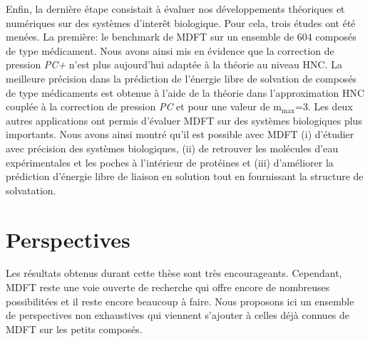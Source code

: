 Enfin, la dernière étape consistait à évaluer nos développements théoriques et numériques sur des systèmes d'interêt biologique. Pour cela, trois études ont été menées. La première: le benchmark de MDFT sur un ensemble de 604 composés de type médicament. Nous avons ainsi mis en évidence que la correction de pression \textit{PC+} n'est plus aujourd'hui adaptée à la théorie au niveau HNC. La meilleure précision dans la prédiction de l'énergie libre de solvation de composés de type médicaments est obtenue à l'aide de la théorie dans l'approximation HNC couplée à la correction de pression \textit{PC} et pour une valeur de $\mathrm{m}_\mathrm{max}$=3.
Les deux autres applications ont permis d'évaluer MDFT sur des systèmes biologiques plus importants. Nous avons ainsi montré qu'il est possible avec MDFT (i) d’étudier avec précision des systèmes biologiques, (ii) de retrouver les molécules d’eau expérimentales et les poches à l’intérieur de protéines et (iii) d’améliorer la prédiction d’énergie libre de liaison en solution tout en fournissant la structure de solvatation. 







\chapter{Perspectives}
\label{chap:perspectives}
Les résultats obtenus durant cette thèse sont très encourageants. Cependant, MDFT reste une voie ouverte de recherche qui offre encore de nombreuses possibilitées et il reste encore beaucoup à faire. Nous proposons ici un ensemble de perspectives non exhaustives qui viennent s'ajouter à celles déjà connues de MDFT sur les petits composés.

